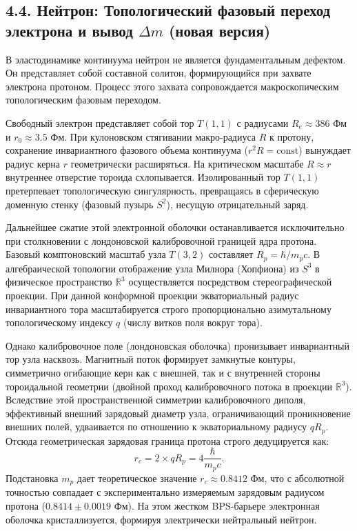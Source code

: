 \documentclass[11pt,a4paper]{article}
\begin{document}
	\subsection{4.4. Нейтрон: Топологический фазовый переход электрона и вывод $\Delta m$ (новая версия)}
	В эластодинамике континуума нейтрон не является фундаментальным дефектом. Он представляет собой составной солитон, формирующийся при захвате электрона протоном. Процесс этого захвата сопровождается макроскопическим топологическим фазовым переходом.
	
	Свободный электрон представляет собой тор $T(1,1)$ с радиусами $R_e \approx 386$ Фм и $r_0 \approx 3.5$ Фм. При кулоновском стягивании макро-радиуса $R$ к протону, сохранение инвариантного фазового объема континуума ($r^2 R = \text{const}$) вынуждает радиус керна $r$ геометрически расширяться. 
	На критическом масштабе $R \approx r$ внутреннее отверстие тороида схлопывается. Изолированный тор $T(1,1)$ претерпевает топологическую сингулярность, превращаясь в сферическую доменную стенку (фазовый пузырь $S^2$), несущую отрицательный заряд.
	
	Дальнейшее сжатие этой электронной оболочки останавливается исключительно при столкновении с лондоновской калибровочной границей ядра протона. Базовый комптоновский масштаб узла $T(3,2)$ составляет $R_p = \hbar / m_p c$. 
	В алгебраической топологии отображение узла Милнора (Хопфиона) из $S^3$ в физическое пространство $\mathbb{R}^3$ осуществляется посредством стереографической проекции. При данной конформной проекции экваториальный радиус инвариантного тора масштабируется строго пропорционально азимутальному топологическому индексу $q$ (числу витков поля вокруг тора). 
	
	Однако калибровочное поле (лондоновская оболочка) пронизывает инвариантный тор узла насквозь. Магнитный поток формирует замкнутые контуры, симметрично огибающие керн как с внешней, так и с внутренней стороны тороидальной геометрии (двойной проход калибровочного потока в проекции $\mathbb{R}^3$). Вследствие этой пространственной симметрии калибровочного диполя, эффективный внешний зарядовый диаметр узла, ограничивающий проникновение внешних полей, удваивается по отношению к экваториальному радиусу $q R_p$.
	Отсюда геометрическая зарядовая граница протона строго дедуцируется как:
	\begin{equation}
		r_c = 2 \times q R_p = 4 \frac{\hbar}{m_p c}.
	\end{equation}
	Подстановка $m_p$ дает теоретическое значение $r_c \approx 0.8412$ Фм, что с абсолютной точностью совпадает с экспериментально измеряемым зарядовым радиусом протона ($0.8414 \pm 0.0019$ Фм). На этом жестком BPS-барьере электронная оболочка кристаллизуется, формируя электрически нейтральный нейтрон.
	
\end{document}
